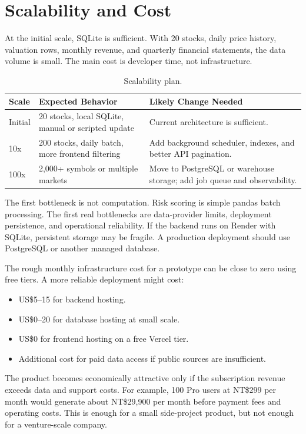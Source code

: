 \section{Scalability and Cost}
\label{sec:scalability-cost}

At the initial scale, SQLite is sufficient. With 20 stocks, daily price history, valuation rows, monthly revenue, and quarterly financial statements, the data volume is small. The main cost is developer time, not infrastructure.

\begin{table}[H]
\centering
\begin{tabular}{p{} p{} p{}}
\toprule
\textbf{Scale} & \textbf{Expected Behavior} & \textbf{Likely Change Needed} \\
\midrule
Initial & 20 stocks, local SQLite, manual or scripted update & Current architecture is sufficient. \\
10x & 200 stocks, daily batch, more frontend filtering & Add background scheduler, indexes, and better API pagination. \\
100x & 2,000+ symbols or multiple markets & Move to PostgreSQL or warehouse storage; add job queue and observability. \\
\bottomrule
\end{tabular}
\caption{Scalability plan.}
\label{tab:scale}
\end{table}

The first bottleneck is not computation. Risk scoring is simple pandas batch processing. The first real bottlenecks are data-provider limits, deployment persistence, and operational reliability. If the backend runs on Render with SQLite, persistent storage may be fragile. A production deployment should use PostgreSQL or another managed database.

The rough monthly infrastructure cost for a prototype can be close to zero using free tiers. A more reliable deployment might cost:

\begin{itemize}
    \item US\$5--15 for backend hosting.
    \item US\$0--20 for database hosting at small scale.
    \item US\$0 for frontend hosting on a free Vercel tier.
    \item Additional cost for paid data access if public sources are insufficient.
\end{itemize}

The product becomes economically attractive only if the subscription revenue exceeds data and support costs. For example, 100 Pro users at NT\$299 per month would generate about NT\$29,900 per month before payment fees and operating costs. This is enough for a small side-project product, but not enough for a venture-scale company.
